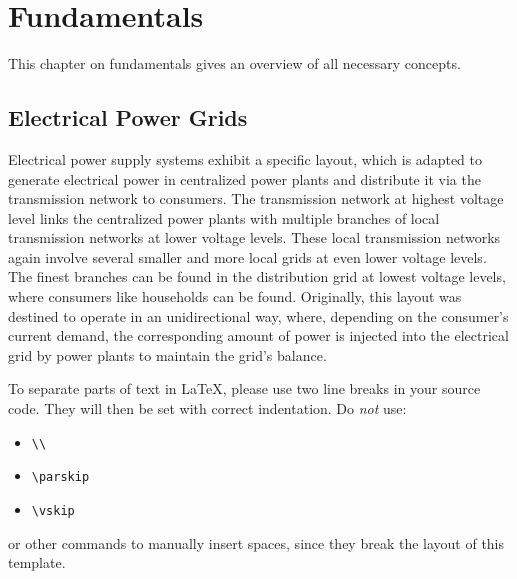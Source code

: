 
\chapter{Fundamentals}
\label{ch:Fundamentals}

This chapter on fundamentals gives an overview of all necessary concepts.

\section{Electrical Power Grids}

Electrical power supply systems exhibit a specific layout, which is adapted to generate electrical power in centralized power plants and distribute it via the transmission network to consumers. The transmission network at highest voltage level links the centralized power plants with multiple branches of local transmission networks at lower voltage levels. These local transmission networks again involve several smaller and more local grids at even lower voltage levels. The finest branches can be found in the distribution grid at lowest voltage levels, where consumers like households can be found. Originally, this layout was destined to operate in an unidirectional way, where, depending on the consumer's current demand, the corresponding amount of power is injected into the electrical grid by power plants to maintain the grid's balance.

To separate parts of text in \LaTeX, please use two line breaks in your source code.
They will then be set with correct indentation.
Do \emph{not} use:
\begin{itemize}
  \itemsep0em
  \item \texttt{\textbackslash\textbackslash}
  \item \texttt{\textbackslash parskip}
  \item \texttt{\textbackslash vskip}
\end{itemize} 
or other commands to manually insert spaces, since they break the layout of this template.

